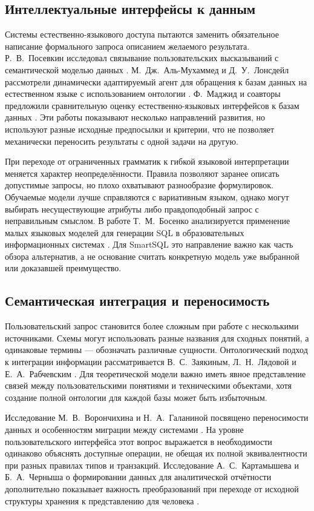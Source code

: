 \subsection{Интеллектуальные интерфейсы к данным}

Системы естественно-языкового доступа пытаются заменить обязательное написание формального запроса описанием желаемого результата. Р.~В.~Посевкин исследовал связывание пользовательских высказываний с семантической моделью данных \cite{posevkin2018}. М.~Дж.~Аль-Мухаммед и Д.~У.~Лонсдейл рассмотрели динамически адаптируемый агент для обращения к базам данных на естественном языке с использованием онтологии \cite{almuhammed2022}. Ф.~Маджид и соавторы предложили сравнительную оценку естественно-языковых интерфейсов к базам данных \cite{majeed2022}. Эти работы показывают несколько направлений развития, но используют разные исходные предпосылки и критерии, что не позволяет механически переносить результаты с одной задачи на другую.

При переходе от ограниченных грамматик к гибкой языковой интерпретации меняется характер неопределённости. Правила позволяют заранее описать допустимые запросы, но плохо охватывают разнообразие формулировок. Обучаемые модели лучше справляются с вариативным языком, однако могут выбирать несуществующие атрибуты либо правдоподобный запрос с неправильным смыслом. В работе Т.~М.~Босенко анализируется применение малых языковых моделей для генерации SQL в образовательных информационных системах \cite{bosenko2025}. Для SmartSQL это направление важно как часть обзора альтернатив, а не основание считать конкретную модель уже выбранной или доказавшей преимущество.

\subsection{Семантическая интеграция и переносимость}

Пользовательский запрос становится более сложным при работе с несколькими источниками. Схемы могут использовать разные названия для сходных понятий, а одинаковые термины — обозначать различные сущности. Онтологический подход к интеграции информации рассматривается В.~С.~Заякиным, Л.~Н.~Лядовой и Е.~А.~Рабчевским \cite{zayakin2022}. Для теоретической модели важно иметь явное представление связей между пользовательскими понятиями и техническими объектами, хотя создание полной онтологии для каждой базы может быть избыточным.

Исследование М.~В.~Ворончихина и Н.~А.~Галаниной посвящено переносимости данных и особенностям миграции между системами \cite{voronchikhin2024}. На уровне пользовательского интерфейса этот вопрос выражается в необходимости одинаково объяснять доступные операции, не обещая их полной эквивалентности при разных правилах типов и транзакций. Исследование А.~С.~Картамышева и Б.~А.~Черныша о формировании данных для аналитической отчётности дополнительно показывает важность преобразований при переходе от исходной структуры хранения к представлению для человека \cite{kartamyshev2023}.

